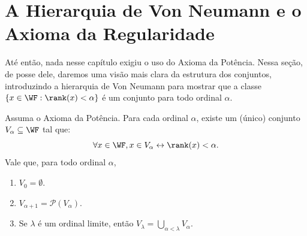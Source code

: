 \section{A Hierarquia de Von Neumann e o Axioma da Regularidade}
Até então, nada nesse capítulo exigiu o uso do Axioma da Potência.
Nessa seção, de posse dele, daremos uma visão mais clara da estrutura dos conjuntos, introduzindo a hierarquia de Von Neumann para mostrar que a classe $\{x\in \WF: \rank(x)<\alpha\}$ é um conjunto para todo ordinal $\alpha$.

\begin{proposition}
    Assuma o Axioma da Potência.
    Para cada ordinal $\alpha$, existe um (único) conjunto $V_\alpha\subseteq \WF$ tal que:
    \[
        \forall x\in \WF, x\in V_\alpha \leftrightarrow \rank(x)<\alpha.
    \]
    Vale que, para todo ordinal $\alpha$,
    \begin{enumerate}[label=(\roman*)]
        \item $V_0=\emptyset$.
        \item $V_{\alpha+1}=\mathcal P(V_\alpha)$.
        \item Se $\lambda$ é um ordinal limite, então $V_\lambda=\bigcup_{\alpha<\lambda} V_\alpha$.
    \end{enumerate}
\end{proposition}
